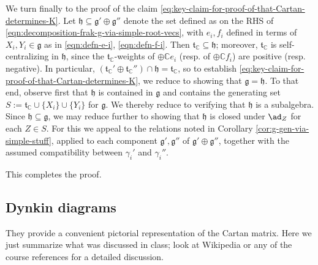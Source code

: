 \documentclass[reqno]{amsart} 
\begin{document}
We turn finally to the proof of the claim \eqref{eq:key-claim-for-proof-of-that-Cartan-determines-K}.  Let $\mathfrak{h} \subseteq \mathfrak{g} ' \oplus \mathfrak{g} ''$ denote the set defined as on the RHS of \eqref{eqn:decomposition-frak-g-via-simple-root-vecs}, with $e_i, f_i$ defined in terms of $X_i, Y_i \in \mathfrak{g}$ as in \eqref{eqn:defn-e-i}, \eqref{eqn:defn-f-i}.  Then $\mathfrak{t}_{\mathbb{C}} \subseteq \mathfrak{h}$; moreover, $\mathfrak{t}_{\mathbb{C}}$ is self-centralizing in $\mathfrak{h}$, since the $\mathfrak{t}_{\mathbb{C}}$-weights of $\oplus \mathbb{C} e_i$ (resp. of $\oplus \mathbb{C} f_i$) are positive (resp. negative).  In particular, $(\mathfrak{t}_{\mathbb{C}}' \oplus \mathfrak{t}_{\mathbb{C}} '') \cap \mathfrak{h} = \mathfrak{t}_{\mathbb{C}}$, so to establish \eqref{eq:key-claim-for-proof-of-that-Cartan-determines-K}, we reduce to showing that $\mathfrak{g} = \mathfrak{h}$.  To that end, observe first that $\mathfrak{h}$ is contained in $\mathfrak{g}$ and contains the generating set $S := \mathfrak{t}_{\mathbb{C}} \cup \{X_i\} \cup \{Y_i\}$ for $\mathfrak{g}$.  We thereby reduce to verifying that $\mathfrak{h}$ is a subalgebra.  Since $\mathfrak{h} \subseteq \mathfrak{g}$, we may reduce further to showing that $\mathfrak{h}$ is closed under $\ad_{Z}$ for each $Z \in S$.  For this we appeal to the relations noted in Corollary \ref{cor:g-gen-via-simple-stuff}, applied to each component $\mathfrak{g} ', \mathfrak{g} ''$ of $\mathfrak{g} ' \oplus \mathfrak{g} ''$, together with the assumed compatibility between $\gamma_i'$ and $\gamma_i''$.

This completes the proof.

\subsection{Dynkin diagrams}
They provide a convenient pictorial representation of the Cartan matrix.  Here we just summarize what was discussed in class; look at Wikipedia or any of the course references for a detailed discussion.
\end{document}
